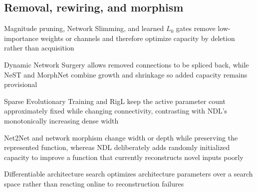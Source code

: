 \subsection{Removal, rewiring, and morphism}
\begin{draftpoints}
  \item Magnitude pruning, Network Slimming, and learned $L_0$ gates remove low-importance weights or channels and therefore optimize capacity by deletion rather than acquisition \parencite{han2015deep,liu2017network,louizos2018learning}
  \item Dynamic Network Surgery allows removed connections to be spliced back, while NeST and MorphNet combine growth and shrinkage so added capacity remains provisional \parencite{guo2016dynamic,dai2018nest,gordon2018morphnet}
  \item Sparse Evolutionary Training and RigL keep the active parameter count approximately fixed while changing connectivity, contrasting with NDL's monotonically increasing dense width \parencite{mocanu2018scalable,evci2020rigging}
  \item Net2Net and network morphism change width or depth while preserving the represented function, whereas NDL deliberately adds randomly initialized capacity to improve a function that currently reconstructs novel inputs poorly \parencite{chen2016net2net,wei2016network}
  \item Differentiable architecture search optimizes architecture parameters over a search space rather than reacting online to reconstruction failures \parencite{liu2019darts}
\end{draftpoints}

